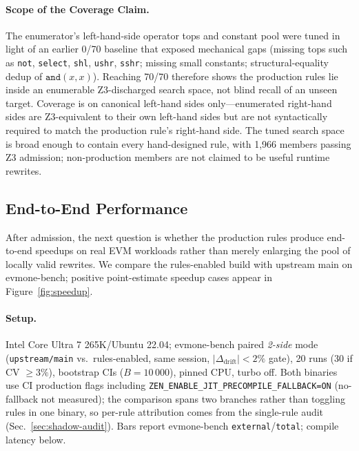 \paragraph{Scope of the Coverage Claim.}
\label{sec:coverage-scope}
{\sloppy
The enumerator's left-hand-side operator tops and constant pool were
tuned in light of an earlier 0/70 baseline that exposed mechanical
gaps (missing tops such as \texttt{not},
\texttt{select}, \texttt{shl}, \texttt{ushr},
\texttt{sshr}; missing small constants; structural-equality dedup of
$\texttt{and}(x,x)$). Reaching 70/70 therefore shows the production
rules lie inside an enumerable Z3-discharged search space, not blind
recall of an unseen target. Coverage is on canonical left-hand sides
only---enumerated right-hand sides are Z3-equivalent to their own
left-hand sides but are not syntactically required to match the
production rule's right-hand side. The tuned search space is broad
enough to contain every hand-designed rule, with 1{,}966 members passing
Z3 admission; non-production members are not claimed to be useful
runtime rewrites.\par}

\subsection{End-to-End Performance}
\label{sec:perf}

After admission, the next question is whether the production rules produce
end-to-end speedups on real EVM workloads rather than merely enlarging the
pool of locally valid rewrites. We compare the rules-enabled build with
upstream main on evmone-bench; positive point-estimate speedup cases appear in
Figure~\ref{fig:speedup}.

\paragraph{Setup.} Intel Core Ultra 7 265K/Ubuntu 22.04; evmone-bench
paired \emph{2-side} mode (\texttt{upstream/main} vs.\ rules-enabled,
same session, $|\Delta_{\text{drift}}|<2\%$ gate), 20 runs (30 if CV $\geq3\%$),
bootstrap CIs ($B{=}10\,000$), pinned CPU, turbo off. Both binaries
use CI production flags including
\texttt{ZEN\_ENABLE\_JIT\_PRECOMPILE\_FALLBACK=ON} (no-fallback
not measured); the comparison spans two branches rather than toggling
rules in one binary, so per-rule attribution comes from the single-rule
audit (Sec.~\ref{sec:shadow-audit}). Bars report evmone-bench
\texttt{external}/\allowbreak\texttt{total}; compile latency below.

